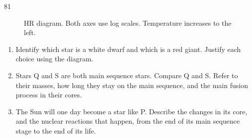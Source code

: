 \begin{practiceq}{8}{1}
\begin{figure}
  \caption*{HR diagram. Both axes use log scales. Temperature increases to the left.}
\end{figure}
\begin{enumerate}[label=(\alph*)]
  \item Identify which star is a white dwarf and which is a red giant. Justify each choice
        using the diagram. 
  \item Stars Q and S are both main sequence stars. Compare Q and S. Refer to their masses,
        how long they stay on the main sequence, and the main fusion process in their cores.
  \item The Sun will one day become a star like P. Describe the changes in its core, and
        the nuclear reactions that happen, from the end of its main sequence stage to the
        end of its life. 
\end{enumerate}
\end{practiceq}
